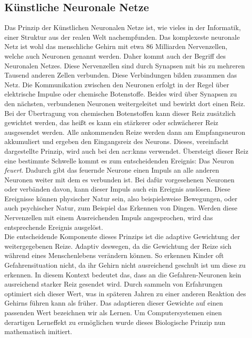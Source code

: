 \subsection{Künstliche Neuronale Netze}
Das Prinzip der Künstlichen Neuronalen Netze ist, wie vieles in der Informatik, einer Struktur aus der realen Welt nachempfunden. Das komplexeste neuronale Netz ist wohl das menschliche Gehirn mit etwa 86 Milliarden Nervenzellen, welche auch Neuronen genannt werden. Daher kommt auch der Begriff des Neuronalen Netzes. Diese Nervenzellen sind durch Synapsen mit bis zu mehreren Tausend anderen Zellen verbunden. Diese Verbindungen bilden zusammen das Netz. Die Kommunikation zwischen den Neuronen erfolgt in der Regel über elektrische Impulse oder chemische Botenstoffe. Beides wird über Synapsen zu den nächsten, verbundenen Neuronen weitergeleitet und bewirkt dort einen Reiz. Bei der Übertragung von chemischen Botenstoffen kann dieser Reiz zusätzlich gewichtet werden, das heißt es kann ein stärkerer oder schwächerer Reiz ausgesendet werden. Alle ankommenden Reize werden dann am Empfangsneuron akkumuliert und ergeben den Eingangsreiz des Neurons. Dieses, vereinfacht dargestellte Prinzip, wird auch bei den  \acrshort{acr:knn}s verwendet. Übersteigt dieser Reiz eine bestimmte Schwelle kommt es zum entscheidenden Ereignis: Das Neuron \textit{feuert}. Dadurch gibt das feuernde Neurone einen Impuls an alle anderen Neuronen weiter mit dem es verbunden ist. Bei dafür vorgesehenen Neuronen oder verbänden davon, kann dieser Impuls auch ein Ereignis auslösen. Diese Ereignisse können physischer Natur sein, also beispielsweise Bewegungen, oder auch psychischer Natur, zum Beispiel das Erkennen von Dingen. Werden diese Nervenzellen mit einem Ausreichenden Impuls angesprochen, wird das entsprechende Ereignis ausgelöst.\\

Die entscheidende Komponente dieses Prinzips ist die adaptive Gewichtung der weitergegebenen Reize. Adaptiv deswegen, da die Gewichtung der Reize sich während eines Menschenlebens verändern können. So erkennen Kinder oft Gefahrensituation nicht, da ihr Gehirn nicht ausreichend geschult ist um diese zu erkennen. In diesem Kontext bedeutet das, dass an die {\glqq Gefahren-Neuronen\grqq} kein ausreichend starker Reiz gesendet wird. Durch sammeln von Erfahrungen optimiert sich dieser Wert, was in späteren Jahren zu einer anderen Reaktion des Gehirns führen kann als früher. Das adaptieren dieser Gewichte auf einen passenden Wert bezeichnen wir als Lernen. Um Computersystemen einen derartigen Lerneffekt zu ermöglichen wurde dieses Biologische Prinzip nun mathematisch imitiert. \\


